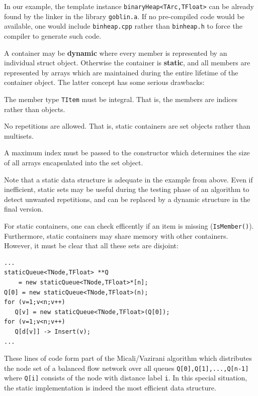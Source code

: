 \documentclass[a4paper,11pt,twoside]{book}
\begin{document}
\begin{multicols}{2}
In our example, the template instance \verb/binaryHeap<TArc,TFloat>/ can be
already found by the linker in the library \verb/goblin.a/. If no pre-compiled
code would be available, one would include \verb/binheap.cpp/ rather than
\verb/binheap.h/ to force the compiler to generate such code.

A container may be {\bf dynamic} where every member is
represented by an individual struct object. Otherwise the container is
{\bf static}, and all members are
represented by arrays which are maintained during the entire lifetime of the
container object. The latter concept has some serious drawbacks:
\begin{myitemize}
\item The member type \verb/TItem/ must be integral. That is, the members are
    indices rather than objects.
\item No repetitions are allowed. That is, static containers are set objects
    rather than multisets.
\item A maximum index must be passed to the constructor which determines the
    size of all arrays encapsulated into the set object.
\end{myitemize}
Note that a static data structure is adequate in the example from above.
Even if inefficient, static sets may be useful during the testing
phase of an algorithm to detect unwanted repetitions, and can be replaced
by a dynamic structure in the final version.

For static containers, one can check efficently if an item is missing
(\verb/IsMember()/). Furthermore, static containers may share memory with
other containers. However, it must be clear that all these sets are disjoint:
\begin{mysample}
\begin{verbatim}
...
staticQueue<TNode,TFloat> **Q
    = new staticQueue<TNode,TFloat>*[n];
Q[0] = new staticQueue<TNode,TFloat>(n);
for (v=1;v<n;v++)
   Q[v] = new staticQueue<TNode,TFloat>(Q[0]);
for (v=1;v<n;v++)
   Q[d[v]] -> Insert(v);
...
\end{verbatim}
\end{mysample}
These lines of code form part of the Micali/Vazirani algorithm which distributes
the node set of a balanced flow network over all queues
\verb/Q[0],Q[1],...,Q[n-1]/ where \verb/Q[i]/ consists of the node with
distance label \verb/i/. In this special situation, the static implementation
is indeed the most efficient data structure.


\end{multicols}
\end{document}
